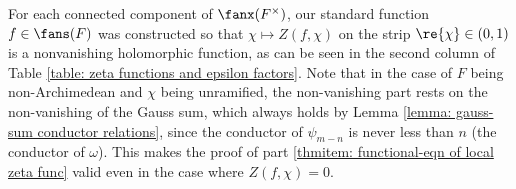 \documentclass[11pt, x11names, openany]{book}
\begin{document}
\begin{table}[h!]
    \caption{The standard additive characters, measures and functions on $0 < \re{\chi} < 1$ on each connected component of $\fanx(F^\times)$ that the zeta integrals and epsilon factors were computed with respect to.}
    \label{table: standard functions}
\end{table}



For each connected component of $\fanx(F^\times)$, our standard function $f \in \fans(F)$ was constructed so that $\chi \mapsto Z(f, \chi)$ on the strip $\re{\chi} \in (0, 1)$ is a nonvanishing holomorphic function, as can be seen in the second column of Table \ref{table: zeta functions and epsilon factors}. Note that in the case of $F$ being non-Archimedean and $\chi$ being unramified, the non-vanishing part rests on the non-vanishing of the Gauss sum, which always holds by Lemma \ref{lemma: gauss-sum conductor relations}, since the conductor of $\psi_{m-n}$ is never less than $n$ (the conductor of $\omega$). This makes the proof of part \ref{thmitem: functional-eqn of local zeta func} valid even in the case where $Z(f, \chi) = 0$. 
\end{document}
